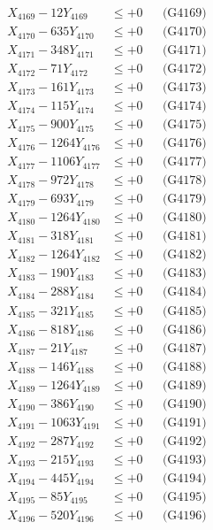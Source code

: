 \documentclass[a4paper,10pt]{article}
\begin{document}
{\begin{align}
X_{4169} - 12Y_{4169} &\leq +0 && \text{(G4169)} \\
X_{4170} - 635Y_{4170} &\leq +0 && \text{(G4170)} \\
\allowbreak
X_{4171} - 348Y_{4171} &\leq +0 && \text{(G4171)} \\
X_{4172} - 71Y_{4172} &\leq +0 && \text{(G4172)} \\
X_{4173} - 161Y_{4173} &\leq +0 && \text{(G4173)} \\
X_{4174} - 115Y_{4174} &\leq +0 && \text{(G4174)} \\
X_{4175} - 900Y_{4175} &\leq +0 && \text{(G4175)} \\
X_{4176} - 1264Y_{4176} &\leq +0 && \text{(G4176)} \\
X_{4177} - 1106Y_{4177} &\leq +0 && \text{(G4177)} \\
X_{4178} - 972Y_{4178} &\leq +0 && \text{(G4178)} \\
X_{4179} - 693Y_{4179} &\leq +0 && \text{(G4179)} \\
X_{4180} - 1264Y_{4180} &\leq +0 && \text{(G4180)} \\
\allowbreak
X_{4181} - 318Y_{4181} &\leq +0 && \text{(G4181)} \\
X_{4182} - 1264Y_{4182} &\leq +0 && \text{(G4182)} \\
X_{4183} - 190Y_{4183} &\leq +0 && \text{(G4183)} \\
X_{4184} - 288Y_{4184} &\leq +0 && \text{(G4184)} \\
X_{4185} - 321Y_{4185} &\leq +0 && \text{(G4185)} \\
X_{4186} - 818Y_{4186} &\leq +0 && \text{(G4186)} \\
X_{4187} - 21Y_{4187} &\leq +0 && \text{(G4187)} \\
X_{4188} - 146Y_{4188} &\leq +0 && \text{(G4188)} \\
X_{4189} - 1264Y_{4189} &\leq +0 && \text{(G4189)} \\
X_{4190} - 386Y_{4190} &\leq +0 && \text{(G4190)} \\
\allowbreak
X_{4191} - 1063Y_{4191} &\leq +0 && \text{(G4191)} \\
X_{4192} - 287Y_{4192} &\leq +0 && \text{(G4192)} \\
X_{4193} - 215Y_{4193} &\leq +0 && \text{(G4193)} \\
X_{4194} - 445Y_{4194} &\leq +0 && \text{(G4194)} \\
X_{4195} - 85Y_{4195} &\leq +0 && \text{(G4195)} \\
X_{4196} - 520Y_{4196} &\leq +0 && \text{(G4196)} \\

\end{align}}
\end{document}
